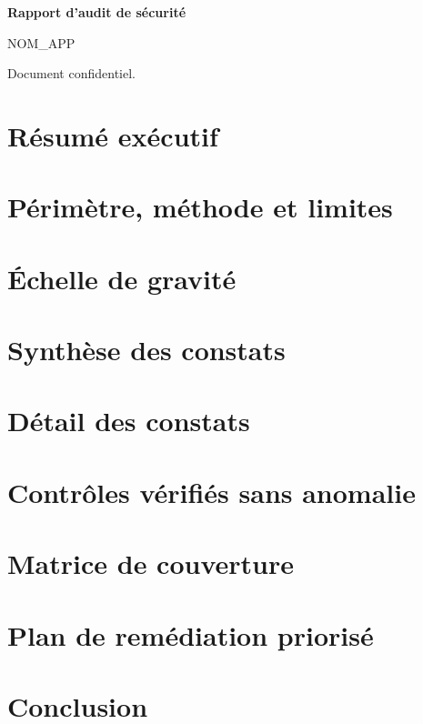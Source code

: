 \documentclass[11pt,a4paper]{article}
\newcommand{\gravite}[1]{%
  \ifstrequal{#1}{Critique}{\textcolor{gcrit}{\textbf{Critique}}}{%
  \ifstrequal{#1}{Élevée}{\textcolor{gelev}{\textbf{Élevée}}}{%
  \ifstrequal{#1}{Moyenne}{\textcolor{gmoy}{\textbf{Moyenne}}}{%
  \ifstrequal{#1}{Faible}{\textcolor{gfaib}{\textbf{Faible}}}{\textcolor{ginfo}{\textbf{#1}}}}}}}
\newcommand{\cclassif}{}
\newcommand{\constat}[9]{\begin{fiche}{#1 -- #3}{\gravite{#2}}
  \ifdefempty{\cclassif}{}{\textbf{Classification :} \cclassif\par}
  \textbf{Localisation :} #4\par
  \textbf{Description :} #5\par
  \textbf{Impact :} #6\par
  \textbf{Preuve :} #7\par
  \textbf{Recommandation :} #8\par
  \textbf{Statut :} #9
\end{fiche}\renewcommand{\cclassif}{}}
\newcommand{\AUTEURAPP}{NOM\_APP}\newcommand{\DATEAUDIT}{AAAA-MM-JJ}
\begin{document}
\begin{titlepage}\centering\vspace*{3cm}
{\Huge\bfseries Rapport d'audit de sécurité\par}\vspace{0.6cm}
{\Large \AUTEURAPP\par}\vspace{0.4cm}{\large Audit en boîte blanche -- \DATEAUDIT\par}
\vfill{\small Document confidentiel.\par}\end{titlepage}
\tableofcontents\newpage

\section{Résumé exécutif}

\section{Périmètre, méthode et limites}

\section{Échelle de gravité}

\section{Synthèse des constats}

\section{Détail des constats}

\section{Contrôles vérifiés sans anomalie}

\section{Matrice de couverture}

\section{Plan de remédiation priorisé}

\section{Conclusion}
\end{document}
